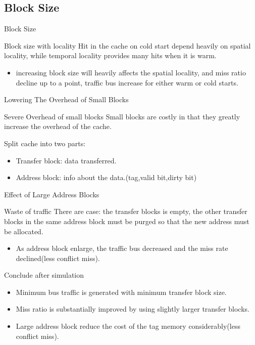 \documentclass{beamer}
\begin{document}
\subsection{Block Size}
\begin{frame}{Block Size}
	\begin{block}{Block size with locality}
		Hit in the cache on cold start depend heavily on spatial locality, while temporal locality provides many hits when it is warm.
	\end{block}
	\begin{itemize}
		\item {increasing block size will heavily affects the spatial locality, and miss ratio decline up to a point, traffic bus increase for either warm or cold starts.}
	\end{itemize}
\end{frame}

\begin{frame}{Lowering The Overhead of Small Blocks}
	\begin{block}{Severe Overhead of small blocks}
		Small blocks are costly in that they greatly increase the overhead of the cache.
	\end{block}
	\begin{block}{Split cache into two parts:}
	\end{block}
	\begin{itemize}
		\item {Transfer block: data transferred.}
		\item {Address block: info about the data.(tag,valid bit,dirty bit)}
	\end{itemize}
\end{frame}

\begin{frame}{Effect of Large Address Blocks}
	\begin{block}{Waste of traffic}
	There are case: the transfer blocks is empty, the other transfer blocks in the same address block must be purged so that the new address must be allocated.
	\end{block}
	\begin{itemize}
		\item {As address block enlarge, the traffic bus decreased and the miss rate declined(less conflict miss).}
	\end{itemize}
	\begin{block}{Conclude after simulation}
	\begin{itemize}
		\item {Minimum bus traffic is generated with minimum transfer block size.}
		\item {Miss ratio is substantially improved by using slightly larger transfer blocks.}
		\item {Large address block reduce the cost of the tag memory considerably(less conflict miss).}
	\end{itemize}
	\end{block}
\end{frame}
\end{document}

